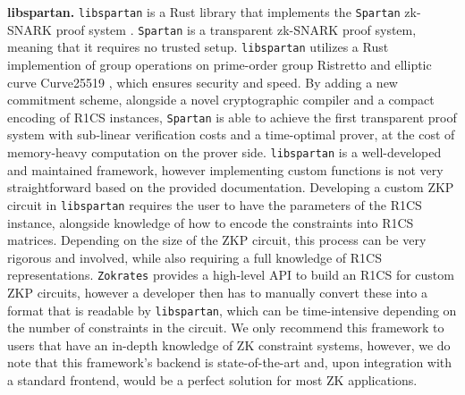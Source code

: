 \textbf{libspartan.} \texttt{libspartan} \cite{Spartan} is a Rust library that implements the \texttt{Spartan} zk-SNARK proof system \cite{setty2020spartan}. \texttt{Spartan} is a transparent zk-SNARK proof system, meaning that it requires no trusted setup. \texttt{libspartan} utilizes a Rust implemention of group operations on prime-order group Ristretto \cite{ristretto} and elliptic curve Curve25519 \cite{bernstein2006curve25519}, which ensures security and speed.
By adding a new commitment scheme, alongside a novel cryptographic compiler and a compact encoding of R1CS instances, \texttt{Spartan} is able to achieve the first transparent proof system with sub-linear verification costs and a time-optimal prover, at the cost of memory-heavy computation on the prover side. \texttt{libspartan} is a well-developed and maintained framework, however implementing custom functions is not very straightforward based on the provided documentation. Developing a custom ZKP circuit in \texttt{libspartan} requires the user to have the parameters of the R1CS instance, alongside knowledge of how to encode the constraints into R1CS matrices. Depending on the size of the ZKP circuit, this process can be very rigorous and involved, while also requiring a full knowledge of R1CS representations.
\texttt{Zokrates} \cite{eberhardt2018zokrates} provides a high-level API to build an R1CS for custom ZKP circuits, however a developer then has to manually convert these into a format that is readable by \texttt{libspartan}, which can be time-intensive depending on the number of constraints in the circuit. We only recommend this framework to users that have an in-depth knowledge of ZK constraint systems, however, we do note that this framework's backend is state-of-the-art and, upon integration with a standard frontend, would be a perfect solution for most ZK applications.

